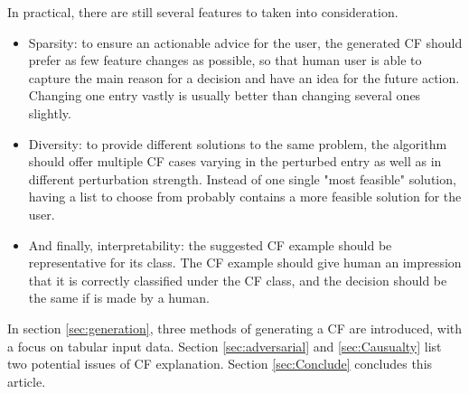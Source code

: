  In practical, there are still several features to taken into consideration. 
 \begin{itemize}
   \item  Sparsity: to ensure an actionable advice for the user, the generated CF should prefer as few feature changes as possible, so that human user is able to capture the main reason for a decision and have an idea for the future action. Changing one entry vastly is usually better than changing several ones slightly.
   \item  Diversity: to provide different solutions to the same problem, the algorithm should offer multiple CF cases varying in the perturbed entry as well as in different perturbation strength. Instead of one single "most feasible" solution, having a list to choose from probably contains a more feasible solution for the user.
   \item  And finally, interpretability: the suggested CF example should be representative for its class. The CF example should give human an impression that it is correctly classified under the CF class, and the decision should be the same if is made by a human.
 \end{itemize}
In section \ref{sec:generation}, three methods of generating a CF are introduced, with a focus on tabular input data. Section \ref{sec:adversarial} and \ref{sec:Causualty} list two potential issues of CF explanation. Section \ref{sec:Conclude} concludes this article.

